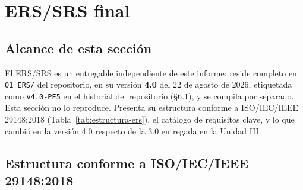 \section{ERS/SRS final}
\label{sec:ers-final}

\subsection{Alcance de esta secci\'on}

El ERS/SRS es un entregable independiente de este informe: reside completo en \texttt{01\_ERS/} del repositorio, en su versi\'on \textbf{4.0} del 22 de agosto de 2026, etiquetada como \texttt{v4.0-PE5} en el historial del repositorio (\S6.1), y se compila por separado. Esta secci\'on no lo reproduce. Presenta su estructura conforme a ISO/IEC/IEEE 29148:2018 (Tabla~\ref{tab:estructura-ers}), el cat\'alogo de requisitos clave, y lo que cambi\'o en la versi\'on 4.0 respecto de la 3.0 entregada en la Unidad III.

\subsection{Estructura conforme a ISO/IEC/IEEE 29148:2018}

